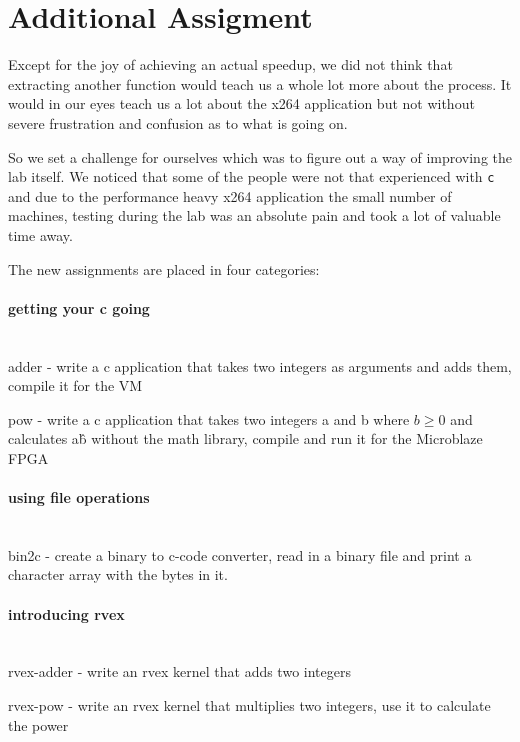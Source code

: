 \section{Additional Assigment}
Except for the joy of achieving an actual speedup, we did not think that extracting another function would teach us a whole lot more about the process. 
It would in our eyes teach us a lot about the x264 application but not without severe frustration and confusion as to what is going on. 

So we set a challenge for ourselves which was to figure out a way of improving the lab itself. 
We noticed that some of the people were not that experienced with \texttt{c} and due to the performance heavy x264 application the small number of \rvex{} machines, testing during the lab was an absolute pain and took a lot of valuable time away. 

The new assignments are placed in four categories:

\paragraph{getting your c going} \hfill \\
adder - write a c application that takes two integers as arguments and adds them, compile it for the VM

pow - write a c application that takes two integers a and b where $b \ge 0$ and calculates a\^b without the math library, compile and run it for the Microblaze FPGA

\paragraph{using file operations} \hfill \\
bin2c - create a binary to c-code converter, read in a binary file and print a character array with the bytes in it. 

\paragraph{introducing rvex} \hfill \\
rvex-adder - write an rvex kernel that adds two integers

rvex-pow - write an rvex kernel that multiplies two integers, use it to calculate the power

